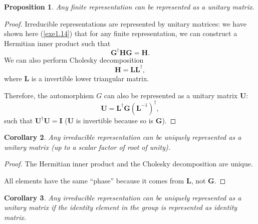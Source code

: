\documentclass[12pt, letterpaper]{article}
\newcommand{\idm}{\mathbf{I}}
\newcommand{\hadj}[1]{{#1}^{\dagger}}
\newtheorem{prop}{Proposition}[section]
\newtheorem{cor}[prop]{Corollary}
\theoremstyle{definition}
\theoremstyle{remark}
\theoremstyle{definition}
\theoremstyle{plain}
\numberwithin{equation}{section}
\begin{document}
	\begin{prop}\label{propRepUnitary}
		Any finite representation can be represented as a unitary matrix.
	\end{prop}
	\begin{proof}
		Irreducible representations are represented by unitary matrices:
		we have shown here (\ref{exe1.14}) that
		for any finite representation, we can construct a Hermitian inner product such that
		\[\hadj{\mathbf{G}}\mathbf{H}\mathbf{G}=\mathbf{H}.\]
		We can also perform Cholesky decomposition
		\[\mathbf{H}=\mathbf{L}\hadj{\mathbf{L}},\]
		where $\mathbf{L}$ is 
		a invertible lower triangular matrix.
		
		Therefore, the automorphism $G$ can also be represented as a unitary matrix $\mathbf{U}$:
		\[\mathbf{U}=\hadj{\mathbf{L}}\mathbf{G}\hadj{(\mathbf{L}^{-1})},\]
		such that $\hadj{\mathbf{U}}\mathbf{U}=\idm$ ($\mathbf{U}$ is invertible because so is $\mathbf{G}$).
	\end{proof}
	\begin{cor}
		Any irreducible representation can be uniquely represented as a unitary matrix (up to a scalar factor of root of unity).
	\end{cor}
	\begin{proof}
		The Hermitian inner product and the Cholesky decomposition are unique.
		
		All elements have the same ``phase'' because it comes from $\mathbf{L}$, not $\mathbf{G}$.
	\end{proof}
	\begin{cor}
		Any irreducible representation can be uniquely represented as a unitary matrix if the identity element in the group
		is represented as identity matrix.
	\end{cor}
\end{document}
